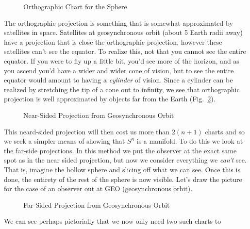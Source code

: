 \documentclass{article}                                                        %
\begin{document}
        \begin{figure}[H]
            \centering
            \captionsetup{type=figure}
            
            \caption{Orthographic Chart for the Sphere}
            \label{fig:Orthographic_Chart_Sphere}
        \end{figure}
        The orthographic projection is something that is somewhat approximated
        by satellites in space. Satellites at geosynchronous orbit (about
        5 Earth radii away) have a projection that is close the orthographic
        projection, however these satellites can't see the equator. To realize
        this, not that you cannot see the entire equator. If you were to fly up
        a little bit, you'd see more of the horizon, and as you ascend you'd
        have a wider and wider cone of vision, but to see the entire equator
        would amount to having a \textit{cylinder} of vision. Since a cylinder
        can be realized by stretching the tip of a cone out to infinity, we see
        that orthographic projection is well approximated by objects far from
        the Earth (Fig.~\ref{fig:GEO_Projection}).
        \begin{figure}[H]
            \centering
            \captionsetup{type=figure}
            
            \caption{Near-Sided Projection from Geosynchronous Orbit}
            \label{fig:GEO_Projection}
        \end{figure}
        This neard-sided projection will then cost us more than $2(n+1)$ charts
        and so we seek a simpler means of showing that $S^{n}$ is a manifold.
        To do this we look at the far-side projections. In this method we put
        the observer at the exact same spot as in the near sided projection, but
        now we consider everything we \textit{can't} see. That is, imagine
        the hollow sphere and slicing off what we can see. Once this is done,
        the entirety of the rest of the sphere is now visible. Let's draw the
        picture for the case of an observer out at GEO (geosynchronous orbit).
        \begin{figure}[H]
            \centering
            \captionsetup{type=figure}
            
            \caption{Far-Sided Projection from Geosynchronous Orbit}
            \label{fig:GEO_Far_Projection}
        \end{figure}
        We can see perhaps pictorially that we now only need two such charts to
\end{document}
